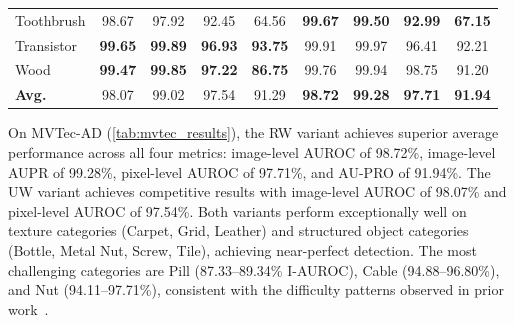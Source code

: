 \begin{table}[t]
{\begin{tabular}{@{}lcccc|cccc@{}}
    Toothbrush& 98.67 & 97.92 & 92.45 & 64.56 & \textbf{99.67} & \textbf{99.50} & \textbf{92.99} & \textbf{67.15} \\
    Transistor& \textbf{99.65} & \textbf{99.89} & \textbf{96.93} & \textbf{93.75} & 99.91 & 99.97 & 96.41 & 92.21 \\
    Wood      & \textbf{99.47} & \textbf{99.85} & \textbf{97.22} & \textbf{86.75} & 99.76 & 99.94 & 98.75 & 91.20 \\
    \midrule
    \textbf{Avg.} & 98.07 & 99.02 & 97.54 & 91.29 & \textbf{98.72} & \textbf{99.28} & \textbf{97.71} & \textbf{91.94} \\
    \bottomrule
  \end{tabular}%
  }
\end{table}

On MVTec-AD (\cref{tab:mvtec_results}), the RW variant achieves superior average performance across all four metrics: image-level AUROC of 98.72\%, image-level AUPR of 99.28\%, pixel-level AUROC of 97.71\%, and AU-PRO of 91.94\%.
The UW variant achieves competitive results with image-level AUROC of 98.07\% and pixel-level AUROC of 97.54\%.
Both variants perform exceptionally well on texture categories (Carpet, Grid, Leather) and structured object categories (Bottle, Metal Nut, Screw, Tile), achieving near-perfect detection.
The most challenging categories are Pill (87.33--89.34\% I-AUROC), Cable (94.88--96.80\%), and Nut (94.11--97.71\%), consistent with the difficulty patterns observed in prior work~\cite{Lendering2025SubspaceAD,Deng2024AnomalyDINO}.

